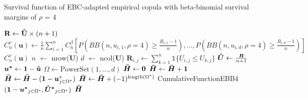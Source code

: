 \documentclass[12pt]{report}
\newcommand{\1}{\mathbf{1}}
\begin{document}
\begin{flushleft}
\begin{algorithm}[H]
\caption{Survival function of EBC-adapted empirical copula with beta-binomial survival margins of $\rho$ = 4}
\begin{algorithmic}
 
    \State $\textbf{R} \gets \mathbf{\Hat{U}} \times (n + 1)$
    \State $C^{v}_{n}(\textbf{u}) \gets \frac{1}{n}\sum\limits_{i = 1}^{n} C_{n}^{\beta} \left[P\left(BB(n, u_{i,1}, \rho = 4) \ge \frac{R_{i,1} - 1}{n}\right), \dots, P\left(BB(n, u_{i,d}, \rho = 4) \ge \frac{R_{i,d} - 1}{n}\right)\right]$
    \State \Return $C^{v}_{n}(\textbf{u})$
\EndProcedure
{}
    \State $n$ $\gets$ nrow($\boldsymbol{U}$)
    \State $d$ $\gets$ ncol($\boldsymbol{U}$)
            \State $\boldsymbol{R}_{i,j} \gets \sum\limits_{k = 1}^{n} \mathds{1} \{ U_{i,j} \le U_{k,j} \}$
        \EndFor
    \EndFor
    \State $\boldsymbol{\Hat{U}} \gets \frac{\boldsymbol{R}}{n + 1}$ 
    \State $\boldsymbol{u^{*}} \gets \boldsymbol{1} - \boldsymbol{\Hat{u}}$ 
    \State $\Omega \gets \mathrm{PowerSet}(1, \dots, d)$ 
    \State $\boldsymbol{\Bar{H}} \gets \boldsymbol{0}$ 
            \State $\boldsymbol{\Bar{H}} \gets \boldsymbol{\Bar{H}} + \boldsymbol{1}$
            \State $\boldsymbol{\Bar{H}} \gets \boldsymbol{\Bar{H}} - (\boldsymbol{1} - \boldsymbol{u}^{*}_{j \in \Omega^{*}})$ 
        \Else
            \State $\boldsymbol{\Bar{H}} \gets \boldsymbol{\Bar{H}} + (-1)^{\mathrm{length}(\Omega^{*})}$ CumulativeFunctionEBB4$(\boldsymbol{1} - \boldsymbol{u^{*}}_{j \in \Omega^{*}}, \boldsymbol{\Hat{U}^{*}}_{j \in \Omega^{*}}) $
        \EndIf
    \EndFor
    \State \Return $\boldsymbol{\Bar{H}}$
\EndProcedure
\end{algorithmic}
\end{algorithm}


\end{flushleft}
\end{document}
